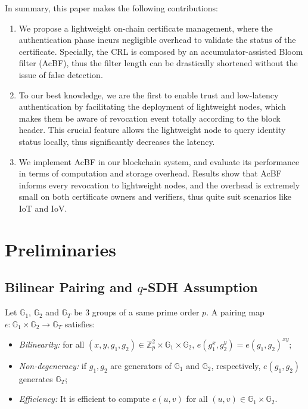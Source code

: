 \documentclass[conference]{IEEEtran}
\begin{document}
In summary, this paper makes the following contributions:
\begin{enumerate}
	\item We propose a lightweight on-chain certificate management, where the authentication phase incurs negligible overhead to validate the status of the certificate. Specially, the CRL is composed by an accumulator-assisted Bloom filter (AcBF), thus the filter length can be drastically shortened without the issue of false detection. 
	\item To our best knowledge, we are the first to enable trust and low-latency authentication by facilitating the deployment of lightweight nodes, which makes them be aware of revocation event totally according to the block header. This crucial feature allows the lightweight node to query identity status locally, thus significantly decreases the latency.
	\item We implement AcBF in our blockchain system, and evaluate its performance in terms of computation and storage overhead. Results show that AcBF informs every revocation to lightweight nodes, and the overhead is extremely small on both certificate owners and verifiers, thus quite suit scenarios like IoT and IoV.
\end{enumerate}



\section{Preliminaries}\label{sec:preliminary}

\subsection{Bilinear Pairing and $q$-SDH Assumption}
Let $\mathbb{G}_1$, $\mathbb{G}_2$ and $\mathbb{G}_T$ be 3 groups of a same prime order $p$. A pairing map $e:\mathbb{G}_1\times \mathbb{G}_2\rightarrow\mathbb{G}_T$ satisfies:
\begin{itemize}
	\item \textit{Bilinearity:} for all $(x,y, g_1, g_2) \in \mathbb{Z}_p^2\times \mathbb{G}_1\times \mathbb{G}_2$, $e(g_1^x, g_2^y) = e(g_1, g_2)^{xy}$;
	\item \textit{Non-degeneracy:} if $g_1, g_2$ are generators of $\mathbb{G}_1$ and $\mathbb{G}_2$, respectively, $e(g_1, g_2)$ generates $\mathbb{G}_T$;
	\item \textit{Efficiency:} It is efficient to compute $e(u,v)$ for all $(u, v) \in \mathbb{G}_1\times \mathbb{G}_2$.
\end{itemize}
\end{document}

